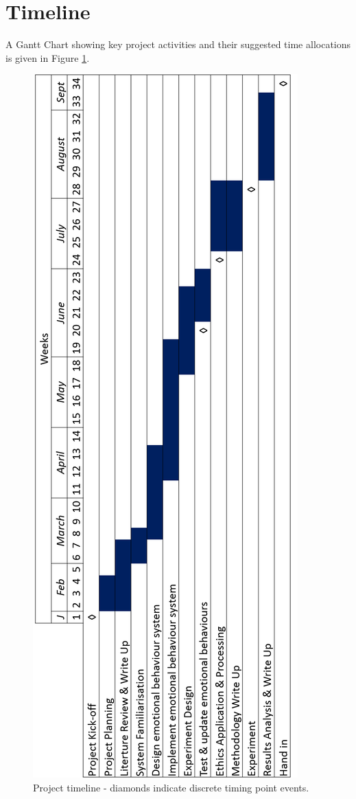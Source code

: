 \documentclass[11pt]{article}
\begin{document}
\section{Timeline}
A Gantt Chart showing key project activities and their suggested time allocations is given in Figure \ref{fig:ProjectTimeline}. 

\begin{figure}
\centering
\includegraphics[height=0.9\textheight,]{ProjectTimeline2.png}
\caption{Project timeline - diamonds indicate discrete timing point events.}
\label{fig:ProjectTimeline}
\end{figure}



\end{document}

